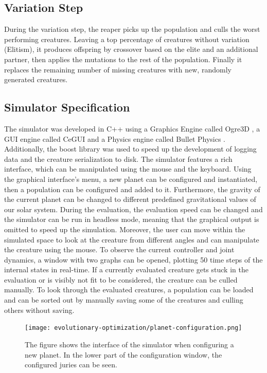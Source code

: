 \documentclass[main]{subfiles}
\begin{document}
\subsection{Variation Step}

During the variation step, the reaper picks up the population and culls the worst performing creatures. %
%
Leaving a top percentage of creatures without variation (Elitism), it produces offspring by crossover based on the elite and an additional partner, then applies the mutations to the rest of the population. %
%
Finally it replaces the remaining number of missing creatures with new, randomly generated creatures.

\subsection{Simulator Specification}

The simulator was developed in C++ using a Graphics Engine called Ogre3D \cite{bib:Ogre3D}, a GUI engine called CeGUI \cite{bib:CEGUI} and a Physics engine called Bullet Physics \cite{bib:BulletPhysics2015}. %
%
Additionally, the boost library \cite{bib:Boost} was used to speed up the development of logging data and the creature serialization to disk. %
%
The simulator features a rich interface, which can be manipulated using the mouse and the keyboard. Using the graphical interface's menu, a new planet can be configured and instantiated, then a population can be configured and added to it. %
%
Furthermore, the gravity of the current planet can be changed to different predefined gravitational values of our solar system. %
%
During the evaluation, the evaluation speed can be changed and the simulator can be run in headless mode, meaning that the graphical output is omitted to speed up the simulation. %
%
Moreover, the user can move within the simulated space to look at the creature from different angles and can manipulate the creature using the mouse. %
%
To observe the current controller and joint dynamics, a window with two graphs can be opened, plotting 50 time steps of the internal states in real-time. %
%
If a currently evaluated creature gets stuck in the evaluation or is visibly not fit to be considered, the creature can be culled manually. %
%
To look through the evaluated creatures, a population can be loaded and can be sorted out by manually saving some of the creatures and culling others without saving. %

\begin{figure}[H]
\centering
\hspace*{-6em}
\texttt{[image: evolutionary-optimization/planet-configuration.png]}
\caption[The simulator planet configuration interface]{The figure shows the interface of the simulator when configuring a new planet. In the lower part of the configuration window, the configured juries can be seen.}
\label{figure:simulator-planet-config}
\end{figure}
\end{document}

